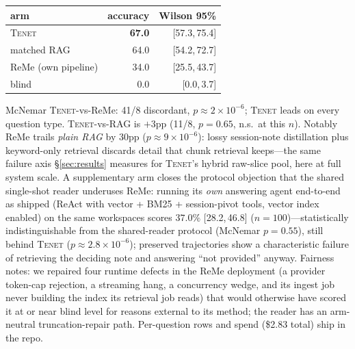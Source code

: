 \documentclass[11pt]{article}
\newcommand{\tenet}{\textsc{Tenet}}
\newcommand{\ci}[2]{{\footnotesize[#1,\,#2]}}
\begin{document}
\begin{center}
\small
\begin{tabular}{lrr}
\toprule
arm & accuracy & Wilson 95\%\\
\midrule
\tenet{} & \textbf{67.0} & \ci{57.3}{75.4}\\
matched RAG & 64.0 & \ci{54.2}{72.7}\\
ReMe (own pipeline) & 34.0 & \ci{25.5}{43.7}\\
blind & 0.0 & \ci{0.0}{3.7}\\
\bottomrule
\end{tabular}
\end{center}

McNemar \tenet{}-vs-ReMe: 41/8 discordant, $p\approx2\times10^{-6}$; \tenet{} leads on
every question type. \tenet{}-vs-RAG is $+3$pp (11/8, $p{=}0.65$, n.s.\ at this $n$).
Notably ReMe trails \emph{plain RAG} by 30pp ($p\approx9\times10^{-6}$): lossy
session-note distillation plus keyword-only retrieval discards detail that chunk
retrieval keeps---the same failure axis \S\ref{sec:results} measures for \tenet{}'s
hybrid raw-slice pool, here at full system scale. A supplementary arm closes the
protocol objection that the shared single-shot reader underuses ReMe: running its
\emph{own} answering agent end-to-end as shipped (ReAct with vector + BM25 +
session-pivot tools, vector index enabled) on the same workspaces scores
$37.0\%$ \ci{28.2}{46.8} ($n{=}100$)---statistically indistinguishable from the
shared-reader protocol (McNemar $p{=}0.55$), still behind \tenet{}
($p\approx2.8\times10^{-6}$); preserved trajectories show a characteristic
failure of retrieving the deciding note and answering ``not provided'' anyway. Fairness notes: we repaired four
runtime defects in the ReMe deployment (a provider token-cap rejection, a streaming
hang, a concurrency wedge, and its ingest job never building the index its retrieval
job reads) that would otherwise have scored it at or near blind level for reasons
external to its method; the reader has an arm-neutral truncation-repair path. Per-question
rows and spend (\$2.83 total) ship in the repo.
\end{document}
